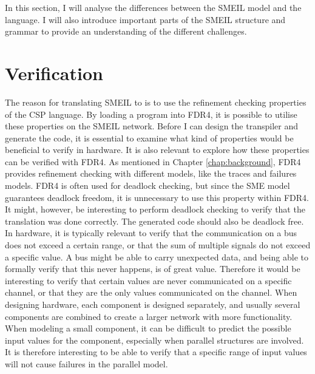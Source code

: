 


In this section, I will analyse the differences between the SMEIL model and the \cspm{} language. I will also introduce important parts of the SMEIL structure and grammar to provide an understanding of the different challenges.
\section{Verification}
\label{sec:analysis_verification}
The reason for translating SMEIL to \cspm{} is to use the refinement checking properties of the CSP language. By loading a \cspm{} program into FDR4, it is possible to utilise these properties on the SMEIL network. Before I can design the transpiler and generate the \cspm{} code, it is essential to examine what kind of properties would be beneficial to verify in hardware. It is also relevant to explore how these properties can be verified with FDR4. As mentioned in Chapter \ref{chap:background}, FDR4 provides refinement checking with different models, like the traces and failures models. FDR4 is often used for deadlock checking, but since the SME model guarantees deadlock freedom, it is unnecessary to use this property within FDR4. It might, however, be interesting to perform deadlock checking to verify that the translation was done correctly. The generated \cspm{} code should also be deadlock free.\\

In hardware, it is typically relevant to verify that the communication on a bus does not exceed a certain range, or that the sum of multiple signals do not exceed a specific value. A bus might be able to carry unexpected data, and being able to formally verify that this never happens, is of great value. Therefore it would be interesting to verify that certain values are never communicated on a specific channel, or that they are the only values communicated on the channel. When designing hardware, each component is designed separately, and usually several components are combined to create a larger network with more functionality. When modeling a small component, it can be difficult to predict the possible input values for the component, especially when parallel structures are involved. It is therefore interesting to be able to verify that a specific range of input values will not cause failures in the parallel model.\\

